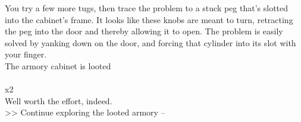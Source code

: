 You try a few more tugs, then trace the problem to a stuck peg that’s slotted into the cabinet’s frame. It looks like these knobs are meant to turn, retracting the peg into the door and thereby allowing it to open. The problem is easily solved by yanking down on the door, and forcing that cylinder into its slot with your finger.\\
 The armory cabinet is looted\\
\\
 x2\\

Well worth the effort, indeed.\\

>> Continue exploring the looted armory -- 